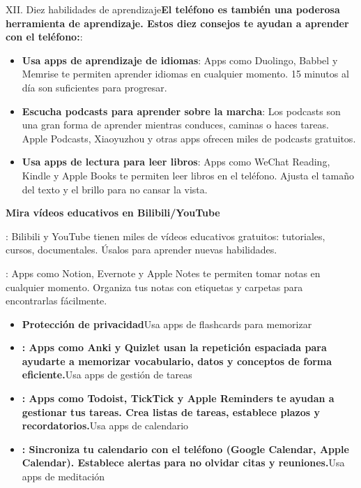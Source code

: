 XII. Diez habilidades de aprendizaje\textbf{El teléfono es también una poderosa herramienta de aprendizaje. Estos diez consejos te ayudan a aprender con el teléfono:}:

\begin{itemize}
  \item \textbf{Usa apps de aprendizaje de idiomas}: Apps como Duolingo, Babbel y Memrise te permiten aprender idiomas en cualquier momento. 15 minutos al día son suficientes para progresar.
  \item \textbf{Escucha podcasts para aprender sobre la marcha}: Los podcasts son una gran forma de aprender mientras conduces, caminas o haces tareas. Apple Podcasts, Xiaoyuzhou y otras apps ofrecen miles de podcasts gratuitos.
  \item \textbf{Usa apps de lectura para leer libros}: Apps como WeChat Reading, Kindle y Apple Books te permiten leer libros en el teléfono. Ajusta el tamaño del texto y el brillo para no cansar la vista.
\end{itemize}

\textbf{Mira vídeos educativos en Bilibili/YouTube}\par

: Bilibili y YouTube tienen miles de vídeos educativos gratuitos: tutoriales, cursos, documentales. Úsalos para aprender nuevas habilidades.


: Apps como Notion, Evernote y Apple Notes te permiten tomar notas en cualquier momento. Organiza tus notas con etiquetas y carpetas para encontrarlas fácilmente.

\begin{itemize}
  \item \textbf{Protección de privacidad}Usa apps de flashcards para memorizar
  \item \textbf{: Apps como Anki y Quizlet usan la repetición espaciada para ayudarte a memorizar vocabulario, datos y conceptos de forma eficiente.}Usa apps de gestión de tareas
  \item \textbf{: Apps como Todoist, TickTick y Apple Reminders te ayudan a gestionar tus tareas. Crea listas de tareas, establece plazos y recordatorios.}Usa apps de calendario
  \item \textbf{: Sincroniza tu calendario con el teléfono (Google Calendar, Apple Calendar). Establece alertas para no olvidar citas y reuniones.}Usa apps de meditación
\end{itemize}

